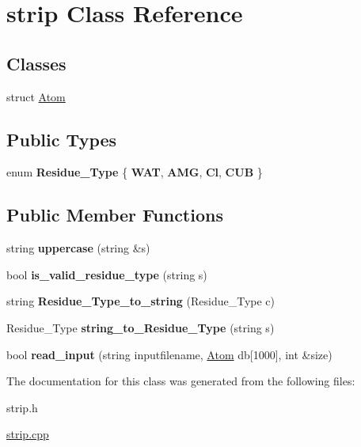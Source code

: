 \hypertarget{classstrip}{
\section{strip Class Reference}
\label{classstrip}
}
\subsection*{Classes}
\begin{DoxyCompactItemize}
\item 
struct \hyperlink{structstrip_1_1Atom}{Atom}
\end{DoxyCompactItemize}
\subsection*{Public Types}
\begin{DoxyCompactItemize}
\item 
enum {\bfseries Residue\_\-Type} \{ {\bfseries WAT}, 
{\bfseries AMG}, 
{\bfseries Cl}, 
{\bfseries CUB}
 \}
\end{DoxyCompactItemize}
\subsection*{Public Member Functions}
\begin{DoxyCompactItemize}
\item 
\hypertarget{classstrip_a9463d4a0e726e7e3fc050a9d5355291d}{
string {\bfseries uppercase} (string \&s)}
\label{classstrip_a9463d4a0e726e7e3fc050a9d5355291d}

\item 
\hypertarget{classstrip_a17ac9203c6120045ea27e6fd25a081b2}{
bool {\bfseries is\_\-valid\_\-residue\_\-type} (string s)}
\label{classstrip_a17ac9203c6120045ea27e6fd25a081b2}

\item 
\hypertarget{classstrip_a688dba6c9770a4af1ecd1a4b07e530d1}{
string {\bfseries Residue\_\-Type\_\-to\_\-string} (Residue\_\-Type c)}
\label{classstrip_a688dba6c9770a4af1ecd1a4b07e530d1}

\item 
\hypertarget{classstrip_a9b0971d86fba8258ab6dc85820da28df}{
Residue\_\-Type {\bfseries string\_\-to\_\-Residue\_\-Type} (string s)}
\label{classstrip_a9b0971d86fba8258ab6dc85820da28df}

\item 
\hypertarget{classstrip_ad6f18f4b93e7a83768cc305e9656dac9}{
bool {\bfseries read\_\-input} (string inputfilename, \hyperlink{structstrip_1_1Atom}{Atom} db\mbox{[}1000\mbox{]}, int \&size)}
\label{classstrip_ad6f18f4b93e7a83768cc305e9656dac9}

\end{DoxyCompactItemize}


The documentation for this class was generated from the following files:\begin{DoxyCompactItemize}
\item 
strip.h\item 
\hyperlink{strip_8cpp}{strip.cpp}\end{DoxyCompactItemize}
